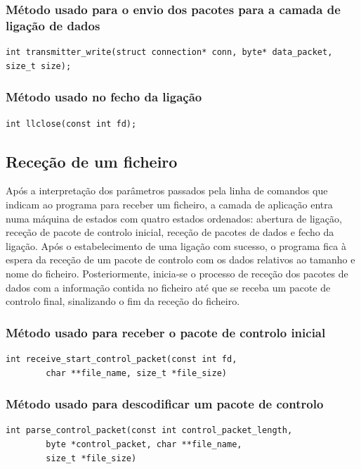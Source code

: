 \documentclass[a4paper,11pt,titlepage]{article}
\begin{document}
\subsubsection*{Método usado para o envio dos pacotes para a camada de ligação de dados}
\begin{lstlisting}[style=customc]
int transmitter_write(struct connection* conn, byte* data_packet, size_t size);
\end{lstlisting}

\subsubsection*{Método usado no fecho da ligação}
\begin{lstlisting}[style=customc]
int llclose(const int fd);
\end{lstlisting}

\subsection{Receção de um ficheiro}

Após a interpretação dos parâmetros passados pela linha de comandos que indicam ao programa para receber um ficheiro, a camada de aplicação entra numa máquina de estados com quatro estados ordenados: abertura de ligação, receção de pacote de controlo inicial, receção de pacotes de dados e fecho da ligação. Após o estabelecimento de uma ligação com sucesso, o programa fica à espera da receção de um pacote de controlo com os dados relativos ao tamanho e nome do ficheiro. Posteriormente, inicia-se o processo de receção dos pacotes de dados com a informação contida no ficheiro até que se receba um pacote de controlo final, sinalizando o fim da receção do ficheiro.

\subsubsection*{Método usado para receber o pacote de controlo inicial}
\begin{lstlisting}[style=customc]
int receive_start_control_packet(const int fd,
		char **file_name, size_t *file_size)
\end{lstlisting}

\subsubsection*{Método usado para descodificar um pacote de controlo}
\begin{lstlisting}[style=customc]
int parse_control_packet(const int control_packet_length,
		byte *control_packet, char **file_name,
		size_t *file_size)
\end{lstlisting}
\end{document}
